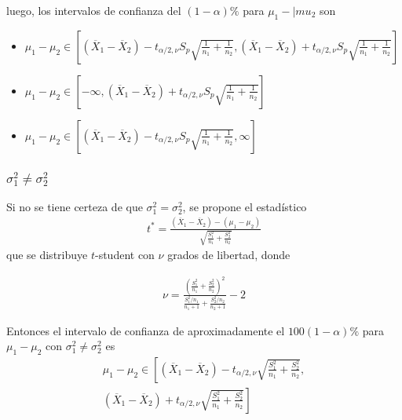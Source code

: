 luego, los intervalos de confianza del $\left(1-\alpha\right)\%$ para $\mu_{1}-|mu_{2}$ son 
\begin{itemize}
\item $\mu_{1}-\mu_{2}\in\left[\left(\overline{X}_{1}-\overline{X}_{2}\right)- t_{\alpha/2,\nu}S_{p}\sqrt{\frac{1}{n_{1}}+\frac{1}{n_{2}}},\left(\overline{X}_{1}-\overline{X}_{2}\right)+ t_{\alpha/2,\nu}S_{p}\sqrt{\frac{1}{n_{1}}+\frac{1}{n_{2}}}\right]$


\item $\mu_{1}-\mu_{2}\in\left[-\infty,\left(\overline{X}_{1}-\overline{X}_{2}\right)+ t_{\alpha/2,\nu}S_{p}\sqrt{\frac{1}{n_{1}}+\frac{1}{n_{2}}}\right]$

\item $\mu_{1}-\mu_{2}\in\left[\left(\overline{X}_{1}-\overline{X}_{2}\right)- t_{\alpha/2,\nu}S_{p}\sqrt{\frac{1}{n_{1}}+\frac{1}{n_{2}}},\infty\right]$


\end{itemize}





\subsubsection*{$\sigma_{1}^{2}\neq\sigma_{2}^{2}$}





Si no se tiene certeza de que $\sigma_{1}^{2}=\sigma_{2}^{2}$, se propone el estad\'istico
\begin{eqnarray}
t^{*}=\frac{\left(\overline{X}_{1}-\overline{X}_{2}\right)-\left(\mu_{1}-\mu_{2}\right)}{\sqrt{\frac{S_{1}^{2}}{n_{1}}+\frac{S_{2}^{2}}{n_{2}}}}
\end{eqnarray}
que se distribuye $t$-student con $\nu$ grados de libertad, donde

\begin{eqnarray*}
\nu=\frac{\left(\frac{S_{1}^{2}}{n_{1}}+\frac{S_{2}^{2}}{n_{2}}\right)^{2}}{\frac{S_{1}^{2}/n_{1}}{n_{1}+1}+\frac{S_{2}^{2}/n_{2}}{n_{2}+1}}-2
\end{eqnarray*}


Entonces el intervalo de confianza de aproximadamente el $100\left(1-\alpha\right)\%$ para $\mu_{1}-\mu_{2}$ con $\sigma_{1}^{2}\neq\sigma_{2}^{2}$ es
\begin{eqnarray*}
\mu_{1}-\mu_{2}\in\left[\left(\overline{X}_{1}-\overline{X}_{2}\right)-t_{\alpha/2,\nu}\sqrt{\frac{S_{1}^{2}}{n_{1}}+\frac{S_{2}^{2}}{n_{2}}},\right.\\
\left.\left(\overline{X}_{1}-\overline{X}_{2}\right)+t_{\alpha/2,\nu}\sqrt{\frac{S_{1}^{2}}{n_{1}}+\frac{S_{2}^{2}}{n_{2}}}\right]
\end{eqnarray*}






